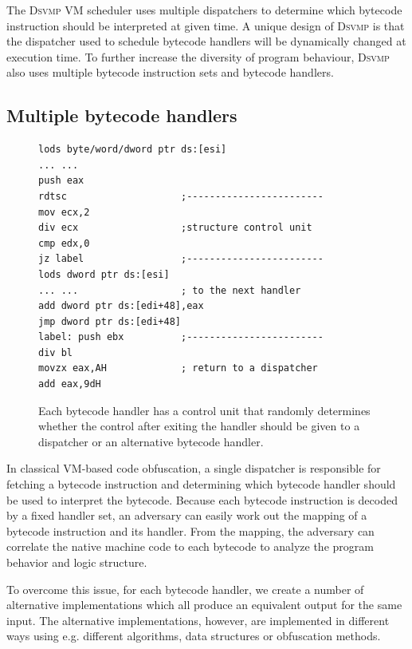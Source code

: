 \documentclass[preprint,12pt,3p]{elsarticle}
\newcommand{\DSVMP}{\textsc{Dsvmp }}
\begin{document}
The \DSVMP VM scheduler uses multiple dispatchers to determine which bytecode instruction should be interpreted at given time.
A unique design of \DSVMP is that the dispatcher used to schedule bytecode handlers will be dynamically changed at execution time. To further increase the diversity of program behaviour, \DSVMP also uses multiple bytecode instruction sets and bytecode handlers.

\subsection{Multiple bytecode handlers}\label{sec:mb}

\begin{figure}[t!]
\scriptsize
\begin{lstlisting}
lods byte/word/dword ptr ds:[esi]
... ...
push eax
rdtsc                    ;------------------------
mov ecx,2
div ecx                  ;structure control unit
cmp edx,0
jz label                 ;------------------------
lods dword ptr ds:[esi]
... ...                  ; to the next handler
add dword ptr ds:[edi+48],eax
jmp dword ptr ds:[edi+48]
label: push ebx          ;------------------------
div bl
movzx eax,AH             ; return to a dispatcher
add eax,9dH
\end{lstlisting}
\caption{Each bytecode handler has a control unit that randomly determines whether the control after exiting the handler should be given to a dispatcher or an alternative bytecode handler. }
\label{fig:newhandler}
\end{figure}

In classical VM-based code obfuscation, a single dispatcher is responsible for fetching a bytecode instruction and
determining which bytecode handler should be used to interpret the bytecode. Because each bytecode instruction
is decoded by a fixed handler set, an adversary can easily work out the mapping of a bytecode instruction and its
handler. From the mapping, the adversary can correlate the native machine code to each bytecode to analyze the
program behavior and logic structure.

To overcome this issue, for each bytecode handler, we create a number of alternative implementations which all
produce an equivalent output for the same input. The alternative implementations, however,
are implemented in different ways using e.g. different algorithms, data structures or obfuscation methods.
\end{document}
